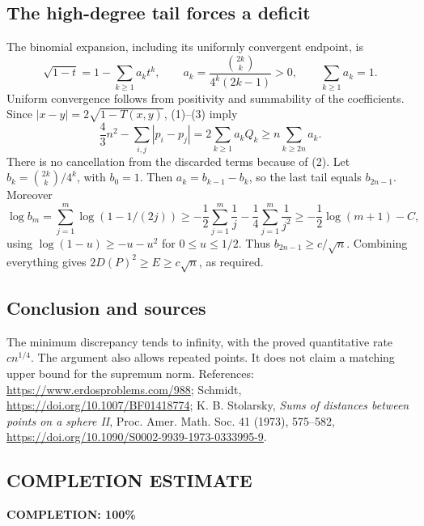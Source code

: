 \subsection*{The high-degree tail forces a deficit}
The binomial expansion, including its uniformly convergent endpoint, is
\[
 \sqrt{1-t}=1-\sum_{k\ge1}a_k t^k,\qquad
 a_k=\frac{\binom{2k}{k}}{4^k(2k-1)}>0,\qquad
 \sum_{k\ge1}a_k=1.
\]
Uniform convergence follows from positivity and summability of the coefficients. Since $|x-y|=2\sqrt{1-T(x,y)}$, (1)--(3) imply
\[
 \frac43n^2-\sum_{i,j}|p_i-p_j|
 =2\sum_{k\ge1}a_kQ_k
 \ge n\sum_{k\ge2n}a_k.
\]
There is no cancellation from the discarded terms because of (2).
Let $b_k=\binom{2k}{k}/4^k$, with $b_0=1$. Then
$a_k=b_{k-1}-b_k$, so the last tail equals $b_{2n-1}$.
Moreover
\[
 \log b_m=\sum_{j=1}^{m}\log(1-1/(2j))
 \ge-\frac12\sum_{j=1}^{m}\frac1j-\frac14\sum_{j=1}^{m}\frac1{j^2}
 \ge-\frac12\log(m+1)-C,
\]
using $\log(1-u)\ge-u-u^2$ for $0\le u\le1/2$.
Thus $b_{2n-1}\ge c/\sqrt n$. Combining everything gives
$2D(P)^2\ge E\ge c\sqrt n$, as required.

\subsection*{Conclusion and sources}
The minimum discrepancy tends to infinity, with the proved quantitative rate $cn^{1/4}$. The argument also allows repeated points. It does not claim a matching upper bound for the supremum norm. References: \url{https://www.erdosproblems.com/988}; Schmidt, \url{https://doi.org/10.1007/BF01418774}; K. B. Stolarsky, \emph{Sums of distances between points on a sphere II}, Proc. Amer. Math. Soc. 41 (1973), 575--582, \url{https://doi.org/10.1090/S0002-9939-1973-0333995-9}.
\subsection*{COMPLETION ESTIMATE}
\textbf{COMPLETION: 100\%}
